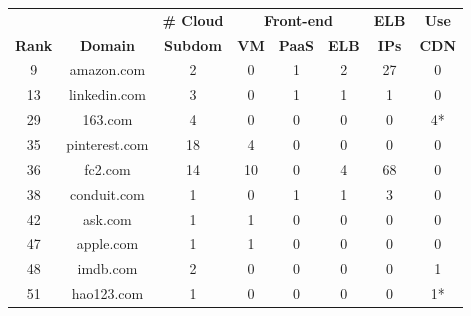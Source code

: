 \setlength{\tabcolsep}{0.1cm}
\begin{tabular}{|c||c|c|c|c|c|c|c|} \hline
& & {\bf \# Cloud} & \multicolumn{3}{c|}{\bf Front-end} & {\bf ELB} &
{\bf Use} \\ 
{\bf Rank} & {\bf Domain} & {\bf Subdom} & {\bf VM} & {\bf PaaS} &
    {\bf ELB} & {\bf IPs} & {\bf CDN} \\ \hline
9      & amazon.com      & 2  & 0  & 1 & 2 & 27 & 0 \\ \hline %
13      & linkedin.com   & 3  & 0  & 1 & 1 & 1  & 0 \\ \hline %
29      & 163.com        & 4  & 0  & 0 & 0 & 0  & 4* \\ \hline %
35      & pinterest.com  & 18 & 4  & 0 & 0 & 0  & 0 \\ \hline %
36      & fc2.com        & 14 & 10 & 0 & 4 & 68 & 0 \\ \hline %
38      & conduit.com    & 1  & 0  & 1 & 1 & 3  & 0 \\ \hline %
42      & ask.com        & 1  & 1  & 0 & 0 & 0  & 0 \\ \hline %
47      & apple.com      & 1  & 1  & 0 & 0 & 0  & 0 \\ \hline %
48     & imdb.com        & 2  & 0  & 0 & 0 & 0  & 1 \\ \hline %
51      & hao123.com     & 1  & 0  & 0 & 0 & 0  & 1* \\ \hline %

\end{tabular}



